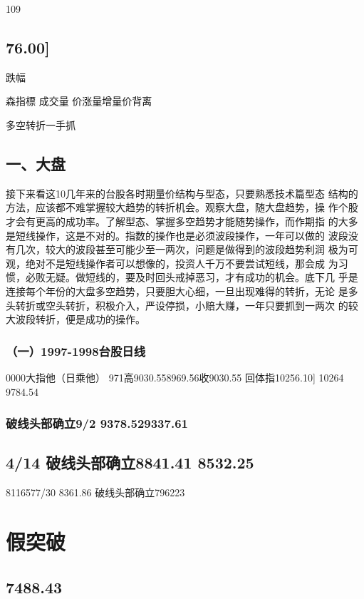 \documentclass{article}
\begin{document}
109

\subsection{76.00]}

跌幅

森指標 成交量 价涨量增量价背离

\clearpage

多空转折一手抓

\subsection{一、大盘}

接下来看这10几年来的台股各时期量价结构与型态，只要熟悉技术篇型态 结构的方法，应该都不难掌握较大趋势的转折机会。观察大盘，随大盘趋势，操 作个股才会有更高的成功率。了解型态、掌握多空趋势才能随势操作，而作期指 的大多是短线操作，这是不对的。指数的操作也是必须波段操作，一年可以做的 波段没有几次，较大的波段甚至可能少至一两次，问题是做得到的波段趋势利润 极为可观，绝对不是短线操作者可以想像的，投资人千万不要尝试短线，那会成 为习惯，必败无疑。做短线的，要及时回头戒掉恶习，才有成功的机会。底下几 乎是连接每个年份的大盘多空趋势，只要胆大心细，一旦出现难得的转折，无论 是多头转折或空头转折，积极介入，严设停损，小赔大赚，一年只要抓到一两次 的较大波段转折，便是成功的操作。

\subsubsection{（一）1997-1998台股日线}

0000大指他（日乘他） 971高9030.558969.56收9030.55 回体指10256.10] 10264 9784.54

\subsubsection{破线头部确立9/2 9378.529337.61}

\subsection{4/14 破线头部确立8841.41 8532.25}

8116577/30 8361.86 破线头部确立796223

\section{假突破}

\subsection{7488.43}
\end{document}
